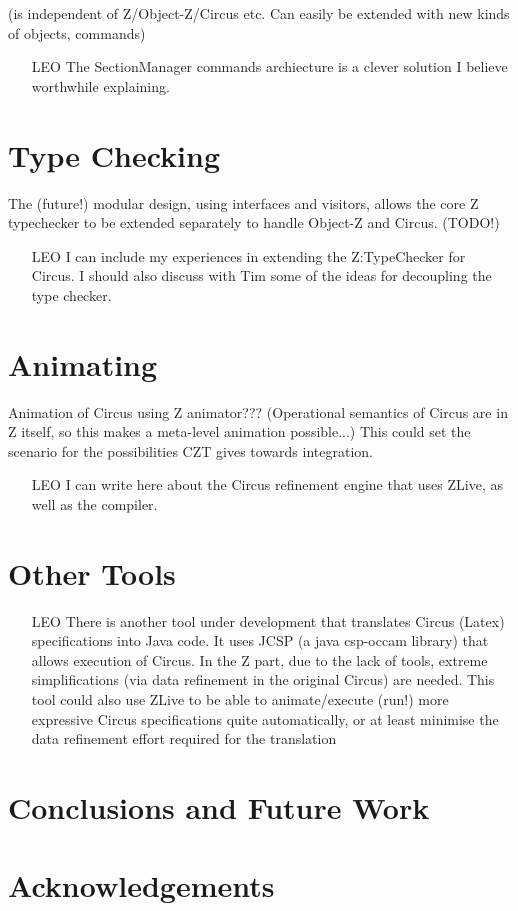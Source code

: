 \documentclass{llncs}
\begin{document}
  (is independent of Z/Object-Z/Circus etc.
  Can easily be extended with new kinds of objects, commands)

    \begin{itemize}
        \item[LEO] The SectionManager commands archiecture is a clever solution I believe worthwhile explaining.
    \end{itemize}

\section{Type Checking}

      The (future!) modular design, using interfaces and visitors,
      allows the core Z typechecker to be extended separately
      to handle Object-Z and Circus.  (TODO!)

    \begin{itemize}
        \item[LEO] I can include my experiences in extending the Z:TypeChecker for Circus.
                    I should also discuss with Tim some of the ideas for decoupling the type checker.
    \end{itemize}

\section{Animating}

    Animation of Circus using Z animator???
      (Operational semantics of Circus are in Z itself, so this makes a meta-level animation possible...)
    This could set the scenario for the possibilities CZT gives towards integration.

    \begin{itemize}
        \item[LEO] I can write here about the Circus refinement engine that uses ZLive, as well as the compiler.
    \end{itemize}


\section{Other Tools}

    \begin{itemize}
        \item[LEO]
        There is another tool under development that translates Circus (Latex) specifications into Java code.
        It uses JCSP (a java csp-occam library) that allows execution of Circus.
        In the Z part, due to the lack of tools, extreme simplifications (via data refinement in the original Circus)
        are needed.
        This tool could also use ZLive to be able to animate/execute (run!) more expressive Circus specifications quite
        automatically, or at least minimise the data refinement effort required for the translation
    \end{itemize}


\section{Conclusions and Future Work} \label{sec:conclusions}

\section*{Acknowledgements}



\end{document}
